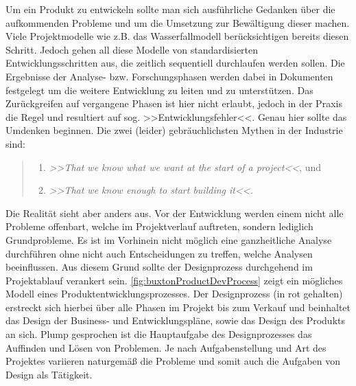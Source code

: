 \medskip Um ein Produkt zu entwickeln sollte man sich ausführliche Gedanken über die aufkommenden Probleme und um die Umsetzung zur Bewältigung dieser machen. Viele Projektmodelle wie z.B. das Wasserfallmodell berücksichtigen bereits diesen Schritt. Jedoch gehen all diese Modelle von standardisierten Entwicklungsschritten aus, die zeitlich sequentiell durchlaufen werden sollen. Die Ergebnisse der Analyse- bzw. Forschungsphasen werden dabei in Dokumenten festgelegt um die weitere Entwicklung zu leiten und zu unterstützen. Das Zurückgreifen auf vergangene Phasen ist hier nicht erlaubt, jedoch in der Praxis die Regel und resultiert auf sog. >>Entwicklungsfehler<<.
Genau hier sollte das Umdenken beginnen. Die zwei (leider) gebräuchlichsten Mythen in der Industrie sind: 
\begin{quote}
	\begin{enumerate}
		\item \textsl{>>That we know what we want at the start of a project<<}, und
		\item \textsl{>>That we know enough to start building it<<.}
	\end{enumerate}
	\begin{flushright}\citep{Buxton:2007}\end{flushright}
\end{quote}

Die Realität sieht aber anders aus. Vor der Entwicklung werden einem nicht alle Probleme offenbart, welche im Projektverlauf auftreten, sondern lediglich Grundprobleme. Es ist im Vorhinein nicht möglich eine ganzheitliche Analyse durchführen ohne nicht auch Entscheidungen zu treffen, welche Analysen beeinflussen. Aus diesem Grund sollte der Designprozess durchgehend im Projektablauf verankert sein.
\autoref{fig:buxtonProductDevProcess} zeigt ein mögliches Modell eines Produktentwicklungsprozesses. Der	Designprozess	(in	rot gehalten) erstreckt sich hierbei über alle Phasen im Projekt bis zum Verkauf und beinhaltet das Design der Business- und Entwicklungspläne, sowie das Design des Produkts an sich. Plump	gesprochen ist die Hauptaufgabe	des	Designprozesses das Auffinden und Lösen von Problemen. Je nach Aufgabenstellung und Art des Projektes variieren naturgemäß die Probleme und somit auch die Aufgaben von Design als Tätigkeit. 

